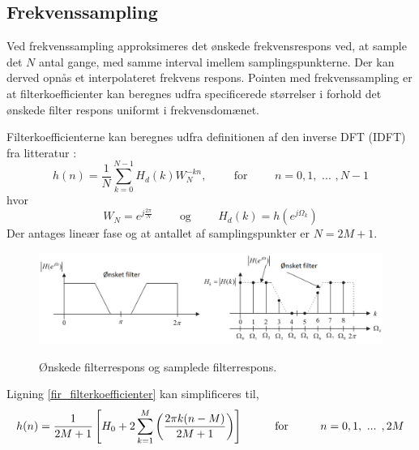 \subsection{Frekvenssampling}
Ved frekvenssampling approksimeres det ønskede frekvensrespons ved, at sample det $N$ antal gange, med samme interval imellem samplingspunkterne. Der kan derved opnås et interpolateret frekvens respons.
Pointen med frekvenssampling er at filterkoefficienter kan beregnes udfra specificerede størrelser i forhold det ønskede filter respons uniformt i frekvensdomænet.

Filterkoefficienterne kan beregnes udfra definitionen af den inverse DFT (IDFT) fra litteratur \cite[Side. 262]{Tan2013}:
\begin {equation}
h(n)=\frac{1}{N}\sum_{k=0}^{N-1}H_{d}(k)W_{N}^{-kn} ,\hspace{1cm}\text{for}\hspace{1cm} n = 0, 1,\text{ ... }, N-1 \label{fir_filterkoefficienter}
\end {equation}
hvor
\begin {equation}
W_{N}=e^{j\frac{2\pi}{N}} \hspace{1cm}\text{og} \hspace{1cm} H_{d}(k)=h(e^{j\Omega_{k}}) \nonumber
\end {equation}
Der antages lineær fase og at antallet af samplingspunkter er $N=2M+1$.


\begin{figure}[h]
\centering
\includegraphics[width=.90\textwidth]{billeder/fir_frekvenssampling.png}\label{fig:fir_frekvenssampling}
\caption{Ønskede filterrespons og samplede filterrespons.}
\end{figure}
\FloatBlock

Ligning \ref{fir_filterkoefficienter} kan simplificeres til,
\begin {equation}
h(n)=\frac{1}{2M+1}\left[ H_{0}+2\sum_{k=1}^{M} \left( \frac{2\pi k(n-M)}{2M+1} \right) \right] \hspace{1cm} \text{for} \hspace{1 cm} n=0,1,\text{ ... },2M
\end {equation}

